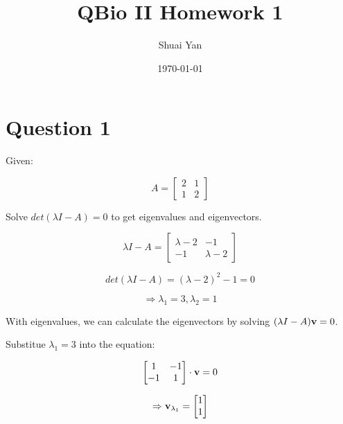 \documentclass{article}
\title{QBio II Homework 1}
\author{Shuai Yan}
\date{\today}
\begin{document}
\maketitle






\newpage
\section{Question 1}

Given:

\[
A = 
\begin{bmatrix}
    2 & 1\\
    1 & 2
\end{bmatrix}
\]

Solve $det(\lambda I-A)=0$ to get eigenvalues and eigenvectors.

\[
\lambda I-A= 
\begin{bmatrix}
    \lambda-2 & -1\\
    -1 & \lambda-2
\end{bmatrix}
\]

\[
det(\lambda I-A)=(\lambda-2)^2-1=0
\]

\[
\Rightarrow \lambda_1=3, \lambda_2=1
\]

With eigenvalues, we can calculate the eigenvectors by solving $(\lambda
I-A)\vb{v}=0$.

Substitue $\lambda_1=3$ into the equation:

\[
\begin{bmatrix}
    1 & -1\\
    -1 & 1
\end{bmatrix}
\cdot \vb{v}=0
\]

\[
\Rightarrow \vb{v}_{\lambda_1}=
\begin{bmatrix}
    1\\
    1
\end{bmatrix}
\]
\end{document}
